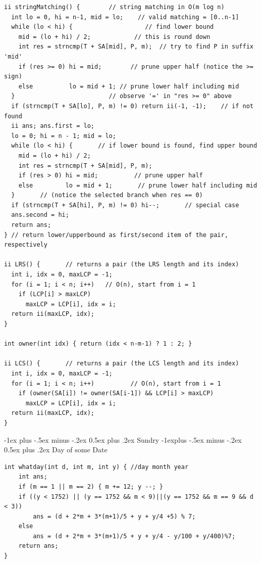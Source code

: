 \documentclass[10pt,landscape]{article}
\makeatletter
\renewcommand{\section}{\@startsection{section}{1}{0mm}%
                                {-1ex plus -.5ex minus -.2ex}%
                                {0.5ex plus .2ex}%
                                {\normalfont\large\bfseries}}
\renewcommand{\subsection}{\@startsection{subsection}{2}{0mm}%
                                {-1explus -.5ex minus -.2ex}%
                                {0.5ex plus .2ex}%
                                {\normalfont\normalsize\bfseries}}
\makeatother
\begin{document}
\begin{multicols}{2}
\begin{lstlisting}
ii stringMatching() {        // string matching in O(m log n)
  int lo = 0, hi = n-1, mid = lo;    // valid matching = [0..n-1]
  while (lo < hi) {                    // find lower bound
    mid = (lo + hi) / 2;            // this is round down
    int res = strncmp(T + SA[mid], P, m);  // try to find P in suffix 'mid'
    if (res >= 0) hi = mid;        // prune upper half (notice the >= sign)
    else          lo = mid + 1; // prune lower half including mid
  }                          // observe '=' in "res >= 0" above
  if (strncmp(T + SA[lo], P, m) != 0) return ii(-1, -1);    // if not found
  ii ans; ans.first = lo;
  lo = 0; hi = n - 1; mid = lo;
  while (lo < hi) {       // if lower bound is found, find upper bound
    mid = (lo + hi) / 2;
    int res = strncmp(T + SA[mid], P, m);
    if (res > 0) hi = mid;          // prune upper half
    else         lo = mid + 1;       // prune lower half including mid
  }       // (notice the selected branch when res == 0)
  if (strncmp(T + SA[hi], P, m) != 0) hi--;       // special case
  ans.second = hi;
  return ans;
} // return lower/upperbound as first/second item of the pair, respectively

ii LRS() {       // returns a pair (the LRS length and its index)
  int i, idx = 0, maxLCP = -1;
  for (i = 1; i < n; i++)   // O(n), start from i = 1
    if (LCP[i] > maxLCP)
      maxLCP = LCP[i], idx = i;
  return ii(maxLCP, idx);
}

int owner(int idx) { return (idx < n-m-1) ? 1 : 2; }

ii LCS() {       // returns a pair (the LCS length and its index)
  int i, idx = 0, maxLCP = -1;
  for (i = 1; i < n; i++)          // O(n), start from i = 1
    if (owner(SA[i]) != owner(SA[i-1]) && LCP[i] > maxLCP)
      maxLCP = LCP[i], idx = i;
  return ii(maxLCP, idx);
}
\end{lstlisting}

\section{Sundry}
\subsection{Day of some Date}
\begin{lstlisting}
int whatday(int d, int m, int y) { //day month year
    int ans;
    if (m == 1 || m == 2) { m += 12; y --; }
    if ((y < 1752) || (y == 1752 && m < 9)||(y == 1752 && m == 9 && d < 3))
        ans = (d + 2*m + 3*(m+1)/5 + y + y/4 +5) % 7;
    else
        ans = (d + 2*m + 3*(m+1)/5 + y + y/4 - y/100 + y/400)%7;
    return ans;
}
\end{lstlisting}


\end{multicols}
\end{document}

